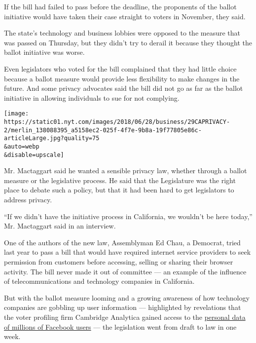 If the bill had failed to pass before the deadline, the proponents of
the ballot initiative would have taken their case straight to voters in
November, they said.

The state's technology and business lobbies were opposed to the measure
that was passed on Thursday, but they didn't try to derail it because
they thought the ballot initiative was worse.

Even legislators who voted for the bill complained that they had little
choice because a ballot measure would provide less flexibility to make
changes in the future. And some privacy advocates said the bill did not
go as far as the ballot initiative in allowing individuals to sue for
not complying.

\texttt{[image: https://static01.nyt.com/images/2018/06/28/business/29CAPRIVACY-2/merlin\_138088395\_a5158ec2-025f-4f7e-9b8a-19f77805e86c-articleLarge.jpg?quality=75\\\&auto=webp\\\&disable=upscale]}

Mr. Mactaggart said he wanted a sensible privacy law, whether through a
ballot measure or the legislative process. He said that the Legislature
was the right place to debate such a policy, but that it had been hard
to get legislators to address privacy.

``If we didn't have the initiative process in California, we wouldn't be
here today,'' Mr. Mactaggart said in an interview.

One of the authors of the new law, Assemblyman Ed Chau, a Democrat,
tried last year to pass a bill that would have required internet service
providers to seek permission from customers before accessing, selling or
sharing their browser activity. The bill never made it out of committee
--- an example of the influence of telecommunications and technology
companies in California.

But with the ballot measure looming and a growing awareness of how
technology companies are gobbling up user information --- highlighted by
revelations that the voter profiling firm Cambridge Analytica gained
access to the
\href{https://www.nytimes.com/2018/04/13/technology/facebook-silicon-valley.html?action=click\&module=RelatedCoverage\&pgtype=Article\&region=Footer}{personal
data of millions of Facebook users} --- the legislation went from draft
to law in one week.

``This is a huge step forward to people all across the country dealing
with this very challenging issue,'' State Senator Bob Hertzberg, a
Democrat and a co-author of the bill, said at a news conference after it
was signed.

